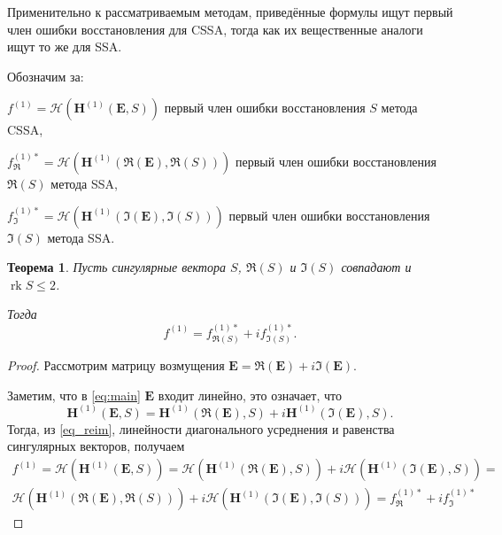 \documentclass[specialist,
               substylefile = spbu.rtx,
               subf,href,colorlinks=true, 12pt]{disser}
\newtheorem{theorem}{Теорема}
\DeclareMathOperator{\rk}{rk}
\begin{document}
Применительно к рассматриваемым методам, приведённые формулы ищут первый член ошибки восстановления для CSSA, тогда как их вещественные аналоги ищут то же для SSA.

Обозначим за:

$f^{(1)} = \mathcal{H}(\mathbf{H}^{(1)}(\mathbf{E}, S))$ первый член ошибки восстановления $S$ метода CSSA,

%

$f^{(1)*}_{\Re} = \mathcal{H}(\mathbf{H}^{(1)}(\mathbf{\Re(E)}, \Re(S)))$ первый член ошибки восстановления $\Re(S)$ метода SSA,

$f^{(1)*}_{\Im} = \mathcal{H}(\mathbf{H}^{(1)}(\mathbf{\Im(E)}, \Im(S)))$ первый член ошибки восстановления $\Im(S)$ метода SSA.

\begin{theorem}\label{th:sum}
	Пусть сингулярные вектора $S$, $\Re(S)$ и $\Im(S)$ совпадают и $\rk S \leq 2$.
	
	Тогда $$f^{(1)} = f^{(1)*}_{\Re(S)} + if^{(1)*}_{\Im(S)}.$$
\end{theorem}
\begin{proof}
	Рассмотрим матрицу возмущения $\mathbf{E} = \Re(\mathbf{E}) + i\Im(\mathbf{E}).$
	
	Заметим, что в \eqref{eq:main} $\mathbf{E}$ входит линейно, это означает, что
	\begin{equation} \label{eq_reim}
		\mathbf{H}^{(1)}(\mathbf{E}, S) = \mathbf{H}^{(1)}(\Re(\mathbf{E}), S) + i\mathbf{H}^{(1)}(\Im(\mathbf{E}), S).
	\end{equation}
%	
	Тогда, из \eqref{eq_reim}, линейности диагонального усреднения и равенства сингулярных векторов, получаем
	\begin{multline*}
		f^{(1)} = \mathcal{H}(\mathbf{H}^{(1)}(\mathbf{E}, S)) = \mathcal{H}(\mathbf{H}^{(1)}(\Re(\mathbf{E}), S)) + i\mathcal{H}(\mathbf{H}^{(1)}(\Im(\mathbf{E}), S)) =\\
		\mathcal{H}(\mathbf{H}^{(1)}(\Re(\mathbf{E}), \Re(S))) + i\mathcal{H}(\mathbf{H}^{(1)}(\Im(\mathbf{E}), \Im(S))) = f^{(1)*}_{\Re} + if^{(1)*}_{\Im}	
	\end{multline*}
	
\end{proof}
\end{document}
